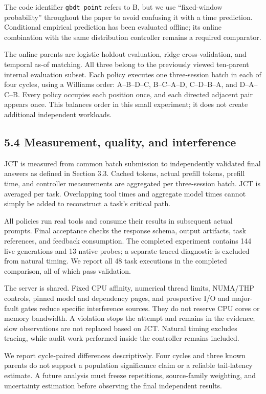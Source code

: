 \documentclass[
  english,
  10pt,
]{article}
\begin{document}
The code identifier \nolinkurl{gbdt_point} refers to B, but we use
``fixed-window probability'' throughout the paper to avoid confusing it
with a time prediction. Conditional empirical prediction has been
evaluated offline; its online combination with the same distribution
controller remains a required comparator.

The online parents are logistic holdout evaluation, ridge
cross-validation, and temporal as-of matching. All three belong to the
previously viewed ten-parent internal evaluation subset. Each policy
executes one three-session batch in each of four cycles, using a
Williams order: A--B--D--C, B--C--A--D, C--D--B--A, and D--A--C--B.
Every policy occupies each position once, and each directed adjacent
pair appears once. This balances order in this small experiment; it does
not create additional independent workloads.

\subsection{5.4 Measurement, quality, and
interference}\label{measurement-quality-and-interference}

JCT is measured from common batch submission to independently validated
final answers as defined in Section 3.3. Cached tokens, actual prefill
tokens, prefill time, and controller measurements are aggregated per
three-session batch. JCT is averaged per task. Overlapping tool times
and aggregate model times cannot simply be added to reconstruct a task's
critical path.

All policies run real tools and consume their results in subsequent
actual prompts. Final acceptance checks the response schema, output
artifacts, task references, and feedback consumption. The completed
experiment contains 144 live generations and 13 native probes; a
separate traced diagnostic is excluded from natural timing. We report
all 48 task executions in the completed comparison, all of which pass
validation.

The server is shared. Fixed CPU affinity, numerical thread limits,
NUMA/THP controls, pinned model and dependency pages, and prospective
I/O and major-fault gates reduce specific interference sources. They do
not reserve CPU cores or memory bandwidth. A violation stops the attempt
and remains in the evidence; slow observations are not replaced based on
JCT. Natural timing excludes tracing, while audit work performed inside
the controller remains included.

We report cycle-paired differences descriptively. Four cycles and three
known parents do not support a population significance claim or a
reliable tail-latency estimate. A future analysis must freeze
repetitions, source-family weighting, and uncertainty estimation before
observing the final independent results.
\end{document}
